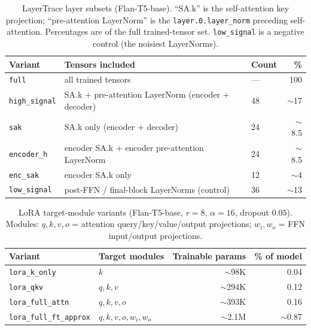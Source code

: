 \documentclass{article}
\theoremstyle{definition}
\theoremstyle{plain}
\begin{document}
\begin{table}[h]
\caption{LayerTrace layer subsets (Flan-T5-base). ``SA.k'' is the self-attention key projection;
``pre-attention LayerNorm'' is the \texttt{layer.0.layer\_norm} preceding self-attention. Percentages
are of the full trained-tensor set. \texttt{low\_signal} is a negative control (the noisiest LayerNorms).}
\label{tab:layer_subsets}
\centering
\begin{tabular}{lll r}
\toprule
Variant & Tensors included & Count & \% \\
\midrule
\texttt{full}        & all trained tensors                                   & ---  & 100 \\
\texttt{high\_signal}& SA.k $+$ pre-attention LayerNorm (encoder $+$ decoder) & 48   & $\sim$17 \\
\texttt{sak}         & SA.k only (encoder $+$ decoder)                       & 24   & $\sim$8.5 \\
\texttt{encoder\_h}  & encoder SA.k $+$ encoder pre-attention LayerNorm      & 24   & $\sim$8.5 \\
\texttt{enc\_sak}    & encoder SA.k only                                     & 12   & $\sim$4 \\
\texttt{low\_signal} & post-FFN / final-block LayerNorms (control)           & 36   & $\sim$13 \\
\bottomrule
\end{tabular}
\end{table}

\begin{table}[h]
\caption{LoRA target-module variants (Flan-T5-base, $r=8$, $\alpha=16$, dropout $0.05$). Modules:
$q,k,v,o$ = attention query/key/value/output projections; $w_i,w_o$ = FFN input/output projections.}
\label{tab:lora_variants}
\centering
\begin{tabular}{ll r r}
\toprule
Variant & Target modules & Trainable params & \% of model \\
\midrule
\texttt{lora\_k\_only}        & $k$                       & $\sim$98K  & 0.04 \\
\texttt{lora\_qkv}            & $q,k,v$                   & $\sim$294K & 0.12 \\
\texttt{lora\_full\_attn}     & $q,k,v,o$                 & $\sim$393K & 0.16 \\
\texttt{lora\_full\_ft\_approx}& $q,k,v,o,w_i,w_o$        & $\sim$2.1M & $\sim$0.87 \\
\bottomrule
\end{tabular}
\end{table}
\end{document}
